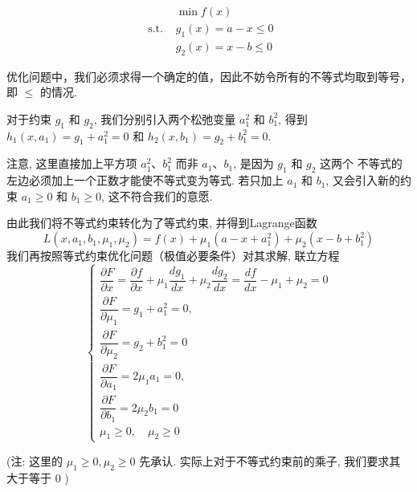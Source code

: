 \begin{example}
    $$\begin{aligned}
        &\min f(x)\\
    \text { s.t. }& g_{1}(x)=a-x \leq 0\\
    &g_{2}(x)=x-b \leq 0
    \end{aligned} $$
\end{example}

\begin{remark}
    优化问题中，我们必须求得一个确定的值，因此不妨令所有的不等式均取到等号，即 $ \leq $ 的情况.
\end{remark}


对于约束 $ g_{1} $ 和 $ g_{2} $, 我们分别引入两个松弛变量 $ a_{1}^{2} $ 和 $ b_{1}^{2} $, 得到 $ h_{1}\left(x, a_{1}\right)=g_{1}+a_{1}^{2}=0 $ 和 $ h_{2}\left(x, b_{1}\right)=g_{2}+b_{1}^{2}=0 $. 

\begin{remark}
    注意, 这里直接加上平方项 $ a_{1}^{2} 、 b_{1}^{2} $ 而非 $ a_{1} 、 b_{1} $, 是因为 $ g_{1} $ 和 $ g_{2} $ 这两个 不等式的左边必须加上一个正数才能使不等式变为等式. 若只加上 $ a_{1} $ 和 $ b_{1} $, 又会引入新的约束 $ a_{1} \geq 0 $ 和 $ b_{1} \geq 0 $, 这不符合我们的意愿.
\end{remark}





由此我们将不等式约束转化为了等式约束, 并得到Lagrange函数
$$
L\left(x, a_{1}, b_{1}, \mu_{1}, \mu_{2}\right)=f(x)+\mu_{1}\left(a-x+a_{1}^{2}\right)+\mu_{2}\left(x-b+b_{1}^{2}\right)
$$
我们再按照等式约束优化问题（极值必要条件）对其求解, 联立方程
$$
\left\{\begin{array}{l}
\dfrac{\partial F}{\partial x}=\dfrac{\partial f}{\partial x}+\mu_{1} \dfrac{d g_{1}}{d x}+\mu_{2} \dfrac{d g_{2}}{d x}=\dfrac{d f}{d x}-\mu_{1}+\mu_{2}=0 \\
\dfrac{\partial F}{\partial \mu_{1}}=g_{1}+a_{1}^{2}=0, \\ 
\dfrac{\partial F}{\partial \mu_{2}}=g_{2}+b_{1}^{2}=0 \\
\dfrac{\partial F}{\partial a_{1}}=2 \mu_{1} a_{1}=0, \\ 
\dfrac{\partial F}{\partial b_{1}}=2 \mu_{2} b_{1}=0 \\
\mu_{1} \geq 0, \quad \mu_{2} \geq 0
\end{array}\right.
$$

(注: 这里的 $\mu_{1} \geq 0, \mu_{2} \geq 0$ 先承认. 实际上对于不等式约束前的乘子, 我们要求其大于等于 0 )

